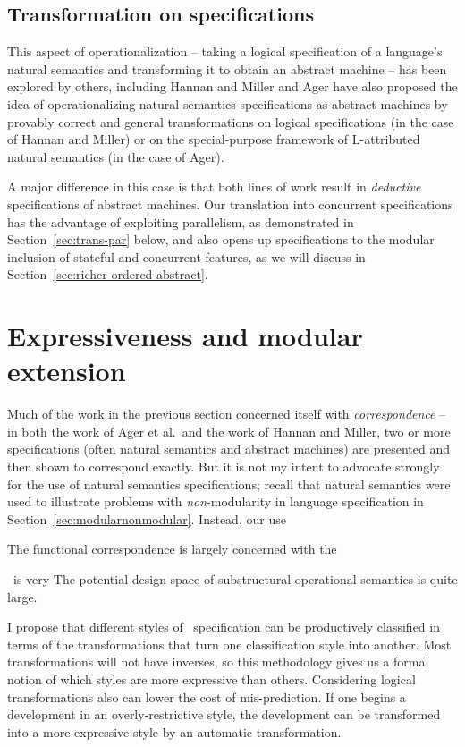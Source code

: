 \subsection{Transformation on specifications}

 This aspect of
operationalization -- taking a logical specification of a language's
natural semantics and transforming it to obtain an abstract machine --
has been explored by others, including Hannan and Miller
\cite{hannan92operational} and Ager \cite{ager04natural} have also
proposed the idea of operationalizing natural semantics specifications
as abstract machines by provably correct and general transformations
on logical specifications (in the case of Hannan and Miller) or on the
special-purpose framework of L-attributed natural semantics (in the
case of Ager). 

A major difference in this case is that both lines of
work result in {\it deductive} specifications of abstract
machines. Our translation into concurrent specifications has the
advantage of exploiting parallelism, as demonstrated in
Section~\ref{sec:trans-par} below, and also opens up specifications to
the modular inclusion of stateful and concurrent features, as we will
discuss in Section~\ref{sec:richer-ordered-abstract}.


\section{Expressiveness and modular extension}

Much of the work in the previous section concerned itself with {\it
  correspondence} -- in both the work of Ager et al.~and the work of
Hannan and Miller, two or more specifications (often natural semantics
and abstract machines) are presented and then shown to correspond
exactly. But it is not my intent to advocate strongly for the use of
natural semantics specifications; recall that natural semantics were
used to illustrate problems with {\it non}-modularity in language
specification in Section~\ref{sec:modularnonmodular}. Instead, our
use 

The functional correspondence is largely concerned with the 

\sls~is very
The potential design space of substructural operational semantics is
quite large. 

I propose that different styles of
\sls~specification can be productively classified in terms of the
transformations that turn one classification style into another. Most
transformations will not have inverses, so this methodology gives us a
formal notion of which styles are more expressive than others.
Considering logical transformations also can lower the cost of
mis-prediction. If one begins a development in an overly-restrictive
style, the development can be transformed into a more expressive style
by an automatic transformation.




